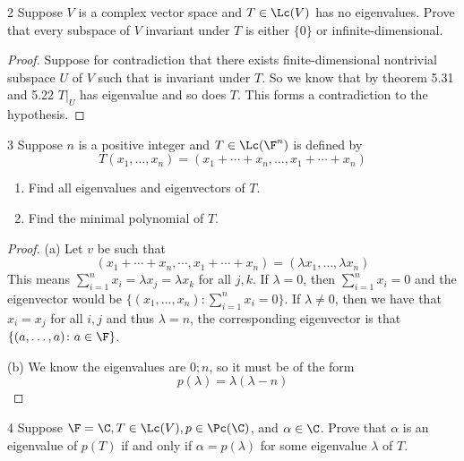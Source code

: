 \documentclass{extarticle}
\begin{document}
\begin{problem}{2}
    Suppose \(V\) is a complex vector space and \(T \in \Lc(V)\) has no eigenvalues. Prove that every subspace 
    of \(V\) invariant under \(T\) is either \(\{0\}\) or infinite-dimensional. 
\end{problem}

\begin{proof}
Suppose for contradiction that there exists finite-dimensional nontrivial subspace \(U\) of \(V\) such that is invariant 
under \(T\). So we know that by theorem 5.31 and 5.22 \(T|_U\) has eigenvalue and so does \(T\). This forms a contradiction 
to the hypothesis.
\end{proof}

\begin{problem}{3}
    Suppose \(n\) is a positive integer and \(T \in \Lc(\F^n)\) is defined by 
    \[T(x_1, \ldots, x_n) = (x_1 + \cdots + x_n, \ldots, x_1 + \cdots + x_n)\]
    \begin{enumerate}[label=(\alph*)]
        \item Find all eigenvalues and eigenvectors of \(T\). 
        \item Find the minimal polynomial of \(T\).
    \end{enumerate}
\end{problem}

\begin{proof}
(a)  Let \(v\) be such that 
\[(x_1 + \cdots + x_n, \cdots, x_1 + \cdots + x_n) = (\lambda x_1, \ldots, \lambda x_n)\]
This means \(\sum_{i=1}^{n} x_i = \lambda x_j = \lambda x_k\) for all \(j, k\). If \(\lambda = 0\), then 
\(\sum_{i=1}^{n} x_i = 0\) and the eigenvector would be \(\{(x_1, \ldots, x_n) \colon \sum_{i=1}^{n}x_i = 0\}\). 
If \(\lambda \neq 0\), then we have that \(x_i = x_j\) for all \(i, j\) and thus \(\lambda = n\), the corresponding 
eigenvector is that \(\{(a, \ldots, a) \colon a \in \F\}\). 

(b) We know the eigenvalues are \(0; n\), so it must be of the form 
\[p(\lambda) = \lambda (\lambda - n)\]
\end{proof}

\begin{problem}{4}
    Suppose \(\F = \C, T \in \Lc(V), p \in \Pc(\C)\), and \(\alpha \in \C\). Prove that \(\alpha\) is an 
    eigenvalue of \(p(T)\) if and only if \(\alpha = p(\lambda)\) for some eigenvalue \(\lambda\) of \(T\).
\end{problem}
\end{document}

